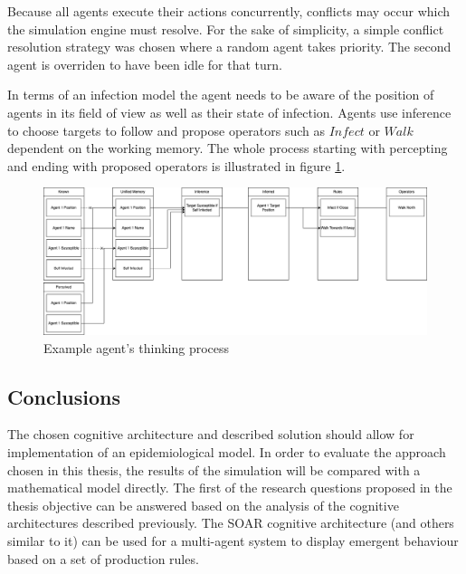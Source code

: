 Because all agents execute their actions concurrently, conflicts may occur which the simulation engine must resolve.
For the sake of simplicity, a simple conflict resolution strategy was chosen where a random agent takes priority.
The second agent is overriden to have been idle for that turn.

In terms of an infection model the agent needs to be aware of the position of agents in its field of view as well as their state of infection.
Agents use inference to choose targets to follow and propose operators such as $Infect$ or $Walk$ dependent on the working memory.
The whole process starting with percepting and ending with proposed operators is illustrated in figure \ref{fig:agent_think.drawio.png}.

\begin{figure}[H]
    \centering
    \includegraphics[width=1.0\textwidth]{images/chapter1/agent_think.drawio.png}
    \caption{Example agent's thinking process}\label{fig:agent_think.drawio.png}
\end{figure}

\subsection{Conclusions}

The chosen cognitive architecture and described solution should allow for implementation of an epidemiological model.
In order to evaluate the approach chosen in this thesis, the results of the simulation will be compared with a mathematical model directly.
The first of the research questions proposed in the thesis objective can be answered based on the analysis of the cognitive architectures described previously.
The SOAR cognitive architecture (and others similar to it) can be used for a multi-agent system to display emergent behaviour based on a set of production rules.

